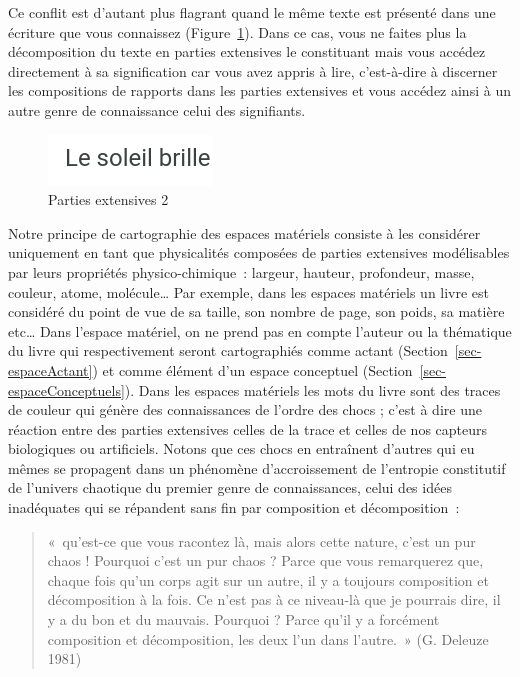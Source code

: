 \documentclass[
  letterpaper,
  DIV=11,
  numbers=noendperiod]{scrreprt}
\begin{document}
Ce conflit est d'autant plus flagrant quand le même texte est présenté
dans une écriture que vous connaissez (Figure~\ref{fig-partExt2}). Dans
ce cas, vous ne faites plus la décomposition du texte en parties
extensives le constituant mais vous accédez directement à sa
signification car vous avez appris à lire, c'est-à-dire à discerner les
compositions de rapports dans les parties extensives et vous accédez
ainsi à un autre genre de connaissance celui des signifiants.

\begin{figure}

{\centering \includegraphics{media/10000001000000A500000033DA0B4C29741E4F62.png}

}

\caption{\label{fig-partExt2}Parties extensives 2}

\end{figure}

Notre principe de cartographie des espaces matériels consiste à les
considérer uniquement en tant que physicalités composées de parties
extensives modélisables par leurs propriétés physico-chimique~: largeur,
hauteur, profondeur, masse, couleur, atome, molécule\ldots{} Par
exemple, dans les espaces matériels un livre est considéré du point de
vue de sa taille, son nombre de page, son poids, sa matière etc\ldots{}
Dans l'espace matériel, on ne prend pas en compte l'auteur ou la
thématique du livre qui respectivement seront cartographiés comme actant
(Section~\ref{sec-espaceActant}) et comme élément d'un espace conceptuel
(Section~\ref{sec-espaceConceptuels}). Dans les espaces matériels les
mots du livre sont des traces de couleur qui génère des connaissances de
l'ordre des chocs ; c'est à dire une réaction entre des parties
extensives celles de la trace et celles de nos capteurs biologiques ou
artificiels. Notons que ces chocs en entraînent d'autres qui eu mêmes se
propagent dans un phénomène d'accroissement de l'entropie constitutif de
l'univers chaotique du premier genre de connaissances, celui des idées
inadéquates qui se répandent sans fin par composition et décomposition~:

\begin{quote}
«~qu'est-ce que vous racontez là, mais alors cette nature, c'est un pur
chaos ! Pourquoi c'est un pur chaos ? Parce que vous remarquerez que,
chaque fois qu'un corps agit sur un autre, il y a toujours composition
et décomposition à la fois. Ce n'est pas à ce niveau-là que je pourrais
dire, il y a du bon et du mauvais. Pourquoi ? Parce qu'il y a forcément
composition et décomposition, les deux l'un dans l'autre.~» (G. Deleuze
1981)
\end{quote}
\end{document}
